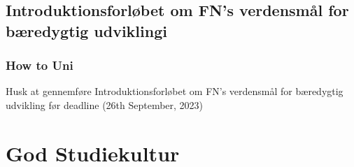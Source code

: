 \documentclass[t, aspectratio=169]{beamer}
\begin{document}
\subsection{Introduktionsforløbet om FN's verdensmål for bæredygtig udviklingi}
\begin{frame}[fragile]
  \frametitle{How to Uni}
  \vspace{30mm}
  \begin{center}
    Husk at gennemføre Introduktionsforløbet om FN's verdensmål for bæredygtig udvikling før deadline (26th September, 2023)
  \end{center}
\end{frame}

\section{God Studiekultur}
\end{document}
